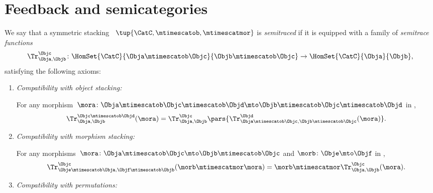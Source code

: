 
\section{Feedback and semicategories}

\begin{ctdefinition}
    \label{def:semitraced-assoc-stack-scat}
    We say that a symmetric stacking ~$\tup{\CatC, \mtimescatob, \mtimescatmor}$ is \emph{semitraced} if it is equipped with a family of \emph{semitrace functions}
    \begin{equation}
        \Tr_{\Obja,\Objb}^\Objc\colon \HomSet{\CatC}{\Obja \mtimescatob \Objc}{\Objb\mtimescatob \Objc}\to \HomSet{\CatC}{\Obja}{\Objb},
    \end{equation}
    satisfying the following axioms:
    \begin{enumerate}

        \item \emph{Compatibility with object stacking:}

              For any morphism~$\mora \colon \Obja\mtimescatob \Objc \mtimescatob \Objd \mto \Objb\mtimescatob \Objc \mtimescatob \Objd$ in \CatC,
              \begin{equation}
                  \label{eq:semicat-semitrace-vanishing_2}
                  \Tr_{\Obja,\Objb}^{\Objc\mtimescatob \Objd}(\mora)=\Tr_{\Obja,\Objb}^\Objc\pars{
                      \Tr_{\Obja \mtimescatob \Objc, \Objb \mtimescatob \Objc}^\Objd(\mora)}.
              \end{equation}

        \item \emph{Compatibility with morphism stacking:}

              For any morphisms~$\mora\colon \Obja\mtimescatob \Objc \mto \Objb\mtimescatob \Objc$ and $\morb \colon \Obje \mto \Objf$ in \CatC,
              \begin{equation}
                  \label{eq:semicat-semitrace-superposing}
                  \Tr_{\Obje\mtimescatob \Obja,\Objf\mtimescatob \Objb}^{\Objc}(\morb \mtimescatmor \mora)=\morb \mtimescatmor \Tr_{\Obja,\Objb}^\Objc(\mora).
              \end{equation}

        \item \emph{Compatibility with permutations:}


    \end{enumerate}
\end{ctdefinition}

